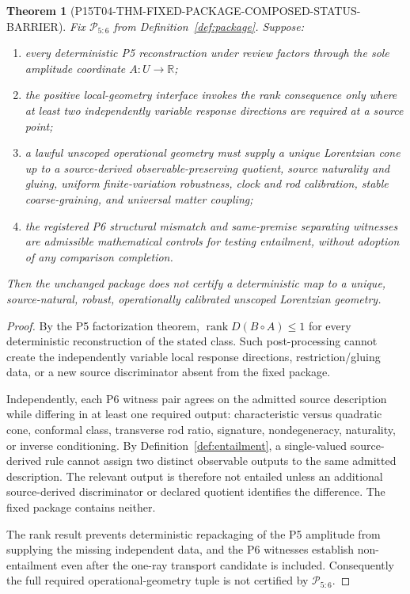 \documentclass[11pt]{article}
\newtheorem{theorem}{Theorem}
\newcommand{\rank}{\operatorname{rank}}
\begin{document}
\begin{theorem}[P15T04-THM-FIXED-PACKAGE-COMPOSED-STATUS-BARRIER]
\label{thm:barrier}
Fix \(\mathcal P_{5:6}\) from Definition~\ref{def:package}.  Suppose:
\begin{enumerate}
  \item every deterministic P5 reconstruction under review factors through
  the sole amplitude coordinate \(A:U\to\mathbb R\);
  \item the positive local-geometry interface invokes the rank consequence
  only where at least two independently variable response directions are
  required at a source point;
  \item a lawful unscoped operational geometry must supply a unique
  Lorentzian cone up to a source-derived observable-preserving quotient,
  source naturality and gluing, uniform finite-variation robustness, clock
  and rod calibration, stable coarse-graining, and universal matter
  coupling;
  \item the registered P6 structural mismatch and same-premise separating
  witnesses are admissible mathematical controls for testing entailment,
  without adoption of any comparison completion.
\end{enumerate}
Then the unchanged package does not certify a deterministic map to a unique,
source-natural, robust, operationally calibrated unscoped Lorentzian
geometry.
\end{theorem}

\begin{proof}
By the P5 factorization theorem,
\(\rank D(B\circ A)\leq1\) for every deterministic reconstruction of the
stated class.  Such post-processing cannot create the independently variable
local response directions, restriction/gluing data, or a new source
discriminator absent from the fixed package.

Independently, each P6 witness pair agrees on the admitted source description
while differing in at least one required output: characteristic versus
quadratic cone, conformal class, transverse rod ratio, signature,
nondegeneracy, naturality, or inverse conditioning.  By
Definition~\ref{def:entailment}, a single-valued source-derived rule cannot
assign two distinct observable outputs to the same admitted description.
The relevant output is therefore not entailed unless an additional
source-derived discriminator or declared quotient identifies the difference.
The fixed package contains neither.

The rank result prevents deterministic repackaging of the P5 amplitude from
supplying the missing independent data, and the P6 witnesses establish
non-entailment even after the one-ray transport candidate is included.
Consequently the full required operational-geometry tuple is not certified
by \(\mathcal P_{5:6}\).
\end{proof}
\end{document}
